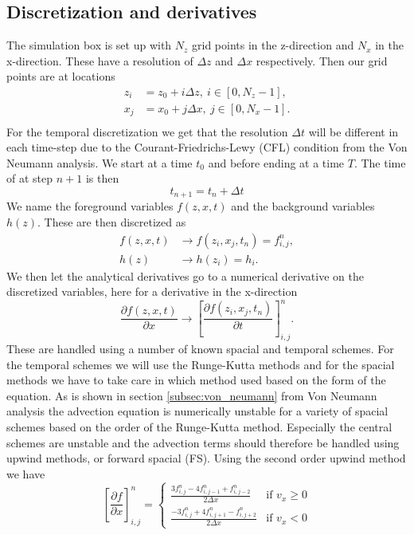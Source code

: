 \subsection{Discretization and derivatives}

The simulation box is set up with $N_z$ grid points in the z-direction and $N_x$ in the x-direction. These have a resolution of $\Delta z$ and $\Delta x$ respectively. Then our grid points are at locations
\begin{align*}
    z_i &= z_0 + i\Delta z,\ i\in[0,N_z-1], \\ 
    x_j &= x_0 + j\Delta x,\ j\in[0,N_x-1].\\ 
\end{align*}
For the temporal discretization we get that the resolution $\Delta t$ will be different in each time-step due to the Courant-Friedrichs-Lewy (CFL) condition from the Von Neumann analysis. We start at a time $t_0$ and before ending at a time $T$. The time of at step $n+1$ is then
\begin{equation*}
    t_{n+1} = t_n + \Delta t
\end{equation*}
We name the foreground variables $f(z,x,t)$ and the background variables $h(z)$. These are then discretized as
\begin{align*}
    f(z,x,t) &\rightarrow f(z_i, x_j, t_n) = f_{i,j}^n,\\
    h(z) &\rightarrow h(z_i) = h_i.
\end{align*}
We then let the analytical derivatives go to a numerical derivative on the discretized variables, here for a derivative in the x-direction
\begin{equation*}
    \frac{\partial f(z,x,t)}{\partial x}\rightarrow \left[\frac{\partial f(z_i,x_j,t_n)}{\partial t} \right]_{i,j}^n.
\end{equation*}
These are handled using a number of known spacial and temporal schemes. For the temporal schemes we will use the Runge-Kutta methods and for the spacial methods we have to take care in which method used based on the form of the equation. As is shown in section \ref{subsec:von_neumann} from Von Neumann analysis the advection equation is numerically unstable for a variety of spacial schemes based on the order of the Runge-Kutta method. Especially the central schemes are unstable and the advection terms should therefore be handled using upwind methods, or forward spacial (FS). Using the second order upwind method we have
\begin{equation}
    \left[\frac{\partial f}{\partial x} \right]_{i,j}^n= 
    \begin{cases} 
        \frac{3f_{i,j}^n-4f_{i,j-1}^n+f_{i,j-2}^n}{2\Delta x} & \text{if } v_x \geq 0 \\
        \frac{-3f_{i,j}^n+4f_{i,j+1}^n-f_{i,j+2}^n}{2\Delta x} & \text{if } v_x < 0 
    \end{cases}
\end{equation}

